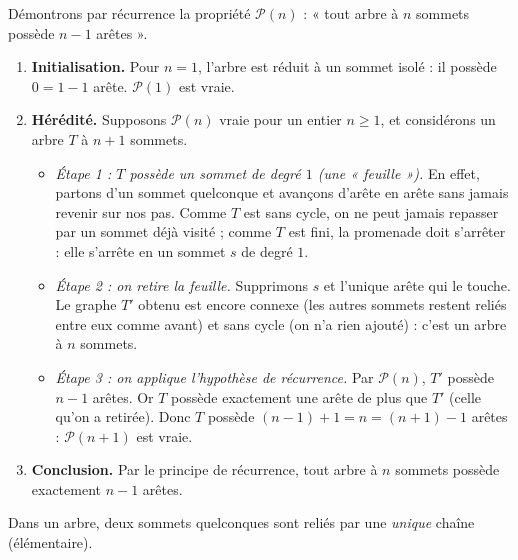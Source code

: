 \documentclass[11pt]{article}
\begin{document}
\begin{experience}
Démontrons par récurrence la propriété $\mathcal{P}(n)$ : « tout arbre à $n$ sommets possède $n-1$ arêtes ».
\begin{enumerate}
\item \textbf{Initialisation.} Pour $n = 1$, l'arbre est réduit à un sommet isolé : il possède $0 = 1 - 1$ arête. $\mathcal{P}(1)$ est vraie.
\item \textbf{Hérédité.} Supposons $\mathcal{P}(n)$ vraie pour un entier $n \geq 1$, et considérons un arbre $T$ à $n+1$ sommets.
\begin{itemize}
\item \emph{Étape 1 : $T$ possède un sommet de degré $1$ (une « feuille »).} En effet, partons d'un sommet quelconque et avançons d'arête en arête sans jamais revenir sur nos pas. Comme $T$ est sans cycle, on ne peut jamais repasser par un sommet déjà visité ; comme $T$ est fini, la promenade doit s'arrêter : elle s'arrête en un sommet $s$ de degré $1$.
\item \emph{Étape 2 : on retire la feuille.} Supprimons $s$ et l'unique arête qui le touche. Le graphe $T'$ obtenu est encore connexe (les autres sommets restent reliés entre eux comme avant) et sans cycle (on n'a rien ajouté) : c'est un arbre à $n$ sommets.
\item \emph{Étape 3 : on applique l'hypothèse de récurrence.} Par $\mathcal{P}(n)$, $T'$ possède $n - 1$ arêtes. Or $T$ possède exactement une arête de plus que $T'$ (celle qu'on a retirée). Donc $T$ possède $(n-1) + 1 = n = (n+1) - 1$ arêtes : $\mathcal{P}(n+1)$ est vraie.
\end{itemize}
\item \textbf{Conclusion.} Par le principe de récurrence, tout arbre à $n$ sommets possède exactement $n - 1$ arêtes.
\end{enumerate}
\end{experience}

\begin{propriete}
Dans un arbre, deux sommets quelconques sont reliés par une \emph{unique} chaîne (élémentaire).
\end{propriete}
\end{document}
